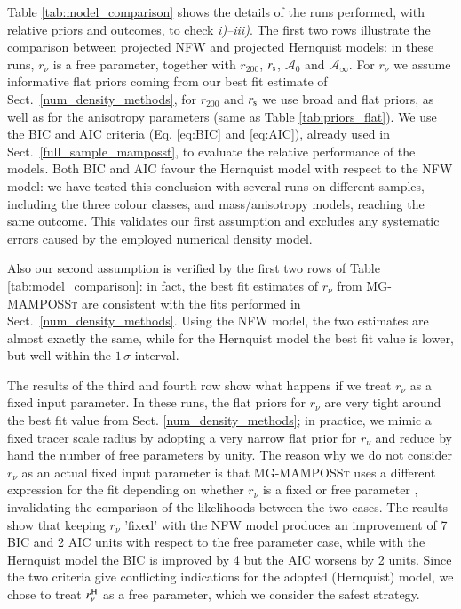\documentclass{aa}
\begin{document}
\noindent Table \ref{tab:model_comparison} shows the details of the runs performed, with relative priors and outcomes, to check \textit{i)--iii)}. The first two rows illustrate the comparison between projected NFW and projected Hernquist models: in these runs, $r_\nu$ is a free parameter, together with $r_{200}$, $r_{\rm s}$, $\mathcal{A}_0$ and $\mathcal{A_\infty}$. For $r_\nu$ we assume informative flat priors coming from our best fit estimate of Sect.~\ref{num_density_methods}, for $r_{200}$ and $r_{\rm s}$ we use broad and flat priors, as well as for the anisotropy parameters (same as Table \ref{tab:priors_flat}). We use the BIC and AIC criteria (Eq. \ref{eq:BIC} and \ref{eq:AIC}), already used in Sect.~\ref{full_sample_mamposst}, to evaluate the relative performance of the models. Both BIC and AIC favour the Hernquist model with respect to the NFW model: %
we have tested this conclusion with several runs on different samples, including the three colour classes, and mass/anisotropy models, reaching the same outcome. This validates our first assumption and excludes any systematic errors caused by the employed numerical density model.

Also our second assumption is verified by the first two rows of Table \ref{tab:model_comparison}: in fact, the best fit estimates of $r_\nu$ from \textsc{MG-MAMPOSSt} are consistent with the fits performed in Sect.~\ref{num_density_methods}. Using the NFW model, the two estimates are almost exactly the same, while for the Hernquist model the best fit value is lower, but well within the $1\,\sigma$ interval. 

The results of the third and fourth row show what happens if we treat $r_\nu$ as a fixed input parameter. In these runs, the flat priors for $r_\nu$ are very tight around the best fit value from Sect. \ref{num_density_methods}; in practice, we mimic a fixed tracer scale radius by adopting a very narrow flat prior for $r_\nu$ and
reduce by hand the number of free parameters by unity. The reason why we do not consider $r_\nu$ as an actual fixed input parameter is that \textsc{MG-MAMPOSSt} uses a different expression for the fit depending on whether $r_\nu$ is a fixed or free parameter \citep{Mamon_2013}, invalidating the comparison of the likelihoods between the two cases. 
The results show that keeping $r_\nu$ 'fixed' with the NFW model produces an improvement of 7 BIC and 2 AIC units with respect to the free parameter case, while with the Hernquist model the BIC is improved by 4 but the AIC worsens by 2 units. Since the two criteria give conflicting indications for the adopted (Hernquist) model, we chose to treat $r_\nu^{\rm H}$ as a free parameter, which we consider the safest strategy. 
\end{document}

